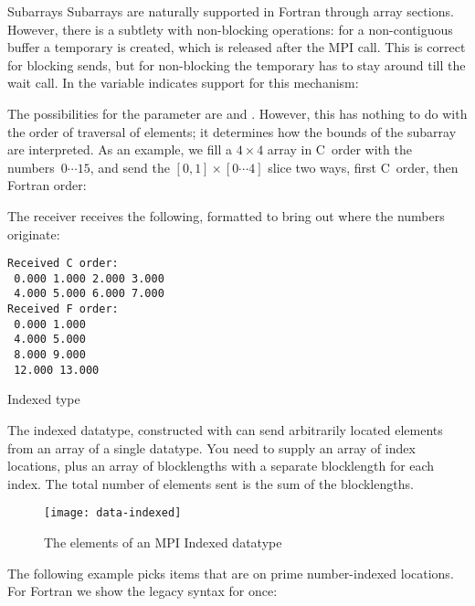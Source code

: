 \begin{fortrannote}{Subarrays}
  Subarrays are naturally supported in Fortran through array sections.
  However, there is a subtlety with non-blocking operations:
  for a non-contiguous buffer a temporary is created, which is released
  after the MPI call. This is correct for blocking sends, but for non-blocking
  the temporary has to stay around till the wait call.
  In  the variable 
  indicates support for this mechanism:
\end{fortrannote}

The possibilities for the  parameter are
 and .
However, this has nothing to do with the order of traversal of elements;
it determines how the bounds of the subarray are interpreted.
As an example, we fill a $4\times 4$ array in C~order with the numbers~$0\cdots15$,
and send the $[0,1]\times [0\cdots4]$ slice two ways, 
first C~order, then Fortran order:
%

The receiver receives the following, formatted to bring out
where the numbers originate:
\begin{verbatim}
Received C order:
 0.000 1.000 2.000 3.000
 4.000 5.000 6.000 7.000
Received F order:
 0.000 1.000
 4.000 5.000
 8.000 9.000
 12.000 13.000
\end{verbatim}

 {Indexed type}
\label{sec:data:indexed}

The indexed datatype, constructed with 
can send arbitrarily located elements from an array of a single datatype.
You need to supply an array of index locations, plus an array of blocklengths
with a separate blocklength for each index. The total number of elements sent
is the sum of the blocklengths.

\begin{figure}[t]
  \texttt{[image: data-indexed]}
  \caption{The elements of an MPI Indexed datatype}
  \label{fig:data-indexed}
\end{figure}

The following example picks items that are on prime number-indexed
locations.
%
For Fortran we show the legacy syntax for once:
%
%

